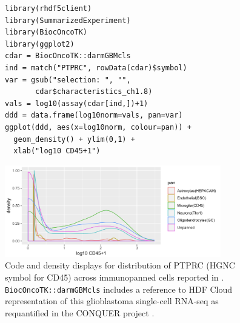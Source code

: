 
\begin{figure}
\begin{verbatim}
library(rhdf5client)
library(SummarizedExperiment)
library(BiocOncoTK)
library(ggplot2)
cdar = BiocOncoTK::darmGBMcls
ind = match("PTPRC", rowData(cdar)$symbol)
var = gsub("selection: ", "", 
       cdar$characteristics_ch1.8)
vals = log10(assay(cdar[ind,])+1)
ddd = data.frame(log10norm=vals, pan=var)
ggplot(ddd, aes(x=log10norm, colour=pan)) + 
  geom_density() + ylim(0,1) + 
  xlab("log10 CD45+1")
\end{verbatim}
\includegraphics[height=4.0cm]{darmDens.png}
\caption{Code and density displays for
distribution of PTPRC (HGNC symbol for CD45) across immunopanned
cells reported in \cite{Darmanis2017}.
\texttt{BiocOncoTK::darmGBMcls} includes
a reference to HDF Cloud representation of
this glioblastoma single-cell RNA-seq
as requantified in the CONQUER project \citep{Soneson2018}.}
\label{hdffig}
\end{figure}

